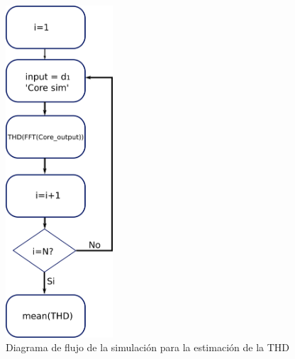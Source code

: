 \begin{figure}[htb!]
        \centering
        \includegraphics[width=4cm]{./figures/thd_sim.png}
        \caption{Diagrama de flujo de la simulación para la estimación de la THD}
        \label{fig:thdsim}
\end{figure}

